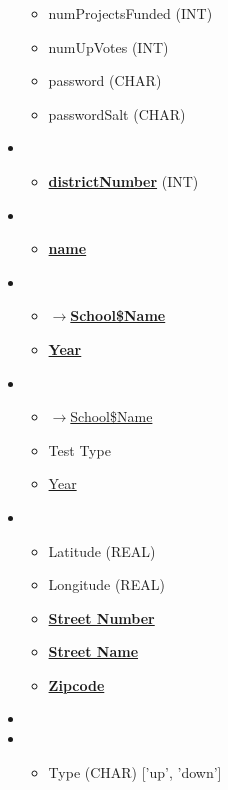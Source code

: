\documentclass{article}
\begin{document}
\begin{itemize}
\begin{itemize}
    \item numProjectsFunded (INT)
    \item numUpVotes (INT)
    \item password (CHAR)
    \item passwordSalt (CHAR)
  \end{itemize}
  \item {}
  \begin{itemize}
    \item \textbf{\underline{districtNumber}} (INT)
  \end{itemize}
  \item {}
  \begin{itemize}
    \item \textbf{\underline{name}}
  \end{itemize}
  \item {}
  \begin{itemize}
    \item \textbf{$\rightarrow$\underline{School\$Name}}
    \item \textbf{\underline{Year}}
  \end{itemize}
  \item {}
  \begin{itemize}
    \item $\rightarrow$\underline{School\$Name}
    \item Test Type
    \item \underline{Year}
  \end{itemize}
  \item {}
  \begin{itemize}
    \item Latitude (REAL)
    \item Longitude (REAL)
    \item \textbf{\underline{Street Number}}
    \item \textbf{\underline{Street Name}}
    \item \textbf{\underline{Zipcode}}
  \end{itemize}
  \item {}
  \item {}
  \begin{itemize}
    \item Type (CHAR) ['up', 'down']
  \end{itemize}
\end{itemize}
\end{document}
